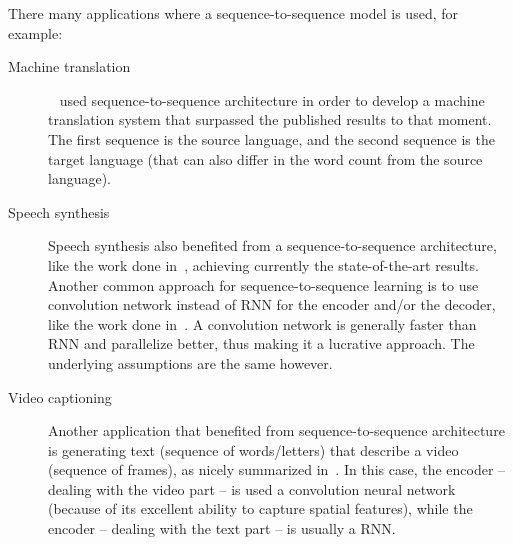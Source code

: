     \par There many applications where a sequence-to-sequence model is used, for example:
    \begin{description}
      \item [Machine translation]~\citep{sutskever2014sequence} used sequence-to-sequence architecture in order to develop a machine translation system that surpassed the published results to that moment. The first sequence is the source language, and the second sequence is the target language (that can also differ in the word count from the source language).
      \item [Speech synthesis] Speech synthesis also benefited from a sequence-to-sequence architecture, like the work done in~\citep{oord2016wavenet,wang2017tacotron}, achieving currently the state-of-the-art results. Another common approach for sequence-to-sequence learning is to use convolution network instead of RNN for the encoder and/or the decoder, like the work done in~\citep{ping2017deep}. A convolution network is generally faster than RNN and parallelize better, thus making it a lucrative approach. The underlying assumptions are the same however.
      \item [Video captioning] Another application that benefited from sequence-to-sequence architecture is generating text (sequence of words/letters) that describe a video (sequence of frames), as nicely summarized in~\citep{aafaq2018video}. In this case, the encoder -- dealing with the video part -- is used a convolution neural network (because of its excellent ability to capture spatial features), while the encoder -- dealing with the text part -- is usually a RNN.
    \end{description}

